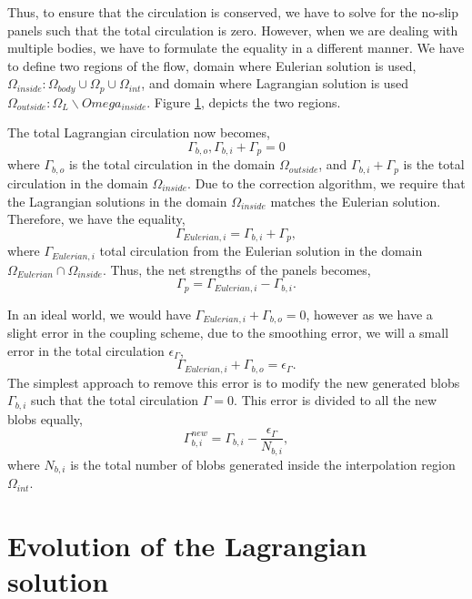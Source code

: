 Thus, to ensure that the circulation is conserved, we have to solve for the no-slip panels such that the total circulation is zero. However, when we are dealing with multiple bodies, we have to formulate the equality in a different manner. We have to define two regions of the flow, domain where Eulerian solution is used, $\Omega_{inside} : \Omega_{body} \cup \Omega_p \cup \Omega_{int}$, and domain where Lagrangian solution is used $\Omega_{outside}: \Omega_L \backslash Omega_{inside}$. Figure \ref{}, depicts the two regions.

The total Lagrangian circulation now becomes,
\begin{equation}
\Gamma_{b,o}, \Gamma_{b,i} + \Gamma_p = 0
\end{equation}
where $\Gamma_{b,o}$ is the total circulation in the domain $\Omega_{outside}$, and $\Gamma_{b,i}+\Gamma_p$ is the total circulation in the domain $\Omega_{inside}$. Due to the correction algorithm, we require that the Lagrangian solutions in the domain $\Omega_{inside}$ matches the Eulerian solution. Therefore, we have the equality,
\begin{equation}
\Gamma_{Eulerian,i} = \Gamma_{b,i} + \Gamma_p,
\end{equation}
where $\Gamma_{Eulerian,i}$ total circulation from the Eulerian solution in the domain $\Omega_{Eulerian} \cap \Omega_{inside}$. Thus, the net strengths of the panels becomes,
\begin{equation}
\Gamma_p = \Gamma_{Eulerian,i} - \Gamma_{b,i}.
\end{equation}

In an ideal world, we would have $\Gamma_{Eulerian,i} + \Gamma_{b,o} = 0$, however as we have a slight error in the coupling scheme, due to the smoothing error, we will a small error in the total circulation $\epsilon_{\Gamma}$,
\begin{equation}
\Gamma_{Eulerian,i} + \Gamma_{b,o} = \epsilon_{\Gamma}.
\end{equation}
The simplest approach to remove this error is to modify the new generated blobs $\Gamma_{b,i}$ such that the total circulation $\Gamma=0$. This error is divided to all the new blobs equally,
\begin{equation}
\Gamma_{b,i}^{new} = \Gamma_{b,i} - \frac{\epsilon_{\Gamma}}{N_{b,i}},
\end{equation}
where $N_{b,i}$ is the total number of blobs generated inside the interpolation region $\Omega_{int}$.
\section{Evolution of the Lagrangian solution}

